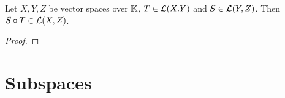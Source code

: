 \documentclass{book}
\begin{document}
	
	\begin{ex}
		Let $X,Y, Z$ be vector spaces over $\mathbb{K}$, $T \in \mathcal{L}(X.Y)$ and $S \in \mathcal{L}(Y, Z)$. Then $S \circ T \in \mathcal{L}(X, Z)$. 
	\end{ex}
	
	\begin{proof}
	\end{proof}
	
	
	
	
	
	
	
	
	
	
	
	
	
	
	
	
	
	
	
	
	
	
	
	
	
	
	
	
	
	
	
	
	
	
	
	
	
	
	
	
	
	
	
	
	
	
	
	
	
	
	
	
	
	
	
	
	
	
	
	
	
	
	\section{Subspaces}
	
	
	
	
	
	
	
	
	
	
	
	
	
	
	
	
	
	
	
	
	
	
	
	
	
	
	
	
	
	
	
\end{document}
